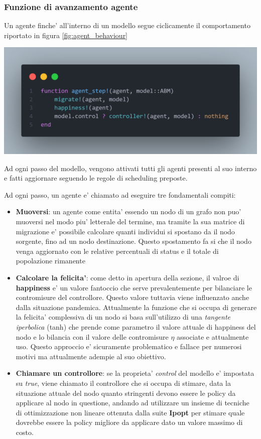 \subsubsection*{Funzione di avanzamento agente}
Un agente finche' all'interno di un modello segue ciclicamente il comportamento
riportato in figura \ref{fig:agent_behaviour}

\begin{minipage}{\linewidth}
	\centering
	\includegraphics[width=\textwidth]{img/agent_behaviour.png}
	\label{fig:agent_behaviour}
\end{minipage}

Ad ogni passo del modello, vengono attivati tutti gli agenti presenti al suo interno e 
fatti aggiornare seguendo le regole di scheduling preposte. 

Ad ogni passo, un agente e' chiamato ad eseguire tre fondamentali compiti:
\begin{itemize}
	\item \textbf{Muoversi}: un agente come entita' essendo un nodo di un grafo non puo'
	muoversi nel modo piu' letterale del termine, ma tramite la sua matrice di migrazione 
	e' possibile calcolare quanti individui si spostano da il nodo sorgente, fino ad un nodo
	destinazione. Questo spostamento fa si che il nodo venga aggiornato con le relative percentuali
	di status e il totale di popolazione rimanente
	\item \textbf{Calcolare la felicita'}: come detto in apertura della sezione, il valroe di \textbf{happiness}
	e' un valore fantoccio che serve prevalentemente per bilanciare le contromisure del controllore.
	Questo valore tuttavia viene influenzato anche dalla situazione pandemica. Attualmente la funzione che si occupa di generare la felicita' complessiva di un nodo si basa
	sull'utilizzo di una \emph{tangente iperbolica} (tanh) che prende come parametro il valore attuale
	di happiness del nodo e lo bilancia con il valore delle contromisure $\eta$ associate e attualmente 
	uso. Questo approccio e' sicuramente problematico e fallace per numerosi motivi ma attualmente 
	adempie al suo obiettivo.
	\item \textbf{Chiamare un controllore}: se la proprieta' \emph{control} del modello e' impostata su
	\emph{true}, viene chiamato il controllore che si occupa di stimare, data la situazione attuale del nodo
	quanto stringenti devono essere le policy da applicare al nodo in questione, andando ad utilizzare
	un insieme di tecniche di ottimizzazione non lineare ottenuta dalla suite \textbf{Ipopt} per 
	stimare quale dovrebbe essere la policy migliore da applicare dato un valore massimo di costo.
\end{itemize}

